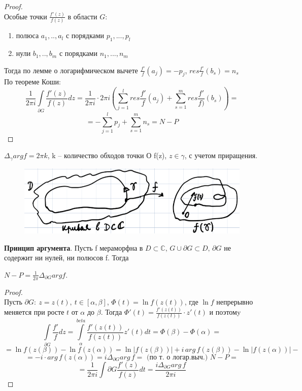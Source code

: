 \begin{proof}
    \ \\
    Особые точки $\frac{f'(z)}{f(z)}$ в области $G$:
    \begin{enumerate}
        \item полюса $a_1, .., a_l$ с порядками $p_1, ..., p_l$
        \item нули $b_1, .., b_m$ с порядками $n_1, ..., n_m$
    \end{enumerate}
    Тогда по лемме о логарифмическом вычете $\frac{f'}{f}(a_j)=-p_j$, $res\frac{f'}{f}(b_s)=n_s$\\
    По теореме Коши:
    $$\frac{1}{2\pi i}\int\limits_{\partial G} \frac{f'(z)}{f(z)}dz =\frac{1}{2\pi i}\cdot 2\pi i \left(\sum_{j=1}^l res\frac{f'}{f} (a_j) + \sum_{s=1}^m res \frac{f'}{f)}(b_s)\right) =$$
    $$= - \sum_{j=1}^l p_j +\sum_{s=1}^m n_s = N-P$$
\end{proof}


$\Delta_{\gamma}arg f = 2\pi k$, k -- количество обходов точки О f(z), $z \in \gamma$, с учетом приращения.

\begin{figure}[h]
    \centering
    \includegraphics[width=0.5\linewidth]{answers/img/image1.png}
    \label{fig:enter-label}
\end{figure}

\textbf{Принцип аргумента}. Пусть f мераморфна в $ D \subset \mathbb{C}, \, G \cup \partial G \subset D, \, \partial G$ не содержит ни нулей, ни полюсов f. Тогда 

$N-P = \frac{1}{2 \pi}\Delta_{\partial G}arg f$.

\begin{proof}
    \ \\
    Пусть $\partial G: \ z=z(t), \ t\in[\alpha, \beta]$,
    $\Phi(t)=\ln f(z(t))$, где $\ln f$ непрерывно меняется при росте $t$ от $\alpha$ до $\beta$. Тогда $\Phi'(t)=\frac{f'(z(t))}{f(z(t))}\cdot z'(t)$ и поэтомy
    $$\int\limits_{\partial G}\frac{f'}{f}dz = \int\limits_{\alpha}^{beta} \frac{f'(z(t))}{f(z(t))}z'(t)dt=\Phi(\beta) - \Phi(\alpha) = $$
    $$= \ln f(z(\beta))-\ln f(z(\alpha)) = \ln |f(z(\beta))| + i \, arg \, f(z(\beta))-\ln |f(z(\alpha))|-$$
    $$= -i\cdot arg\, f(z(\alpha))=i\Delta_{\partial G}arg \, f = \text{ (по т. о логар.выч.) }N-P=$$
    $$=\frac{1}{2\pi i}\int\limits{\partial G} \frac{f'(z)}{f(z)}dt=\frac{i\Delta_{\partial G}arg\,f}{2\pi i}$$
\end{proof}


